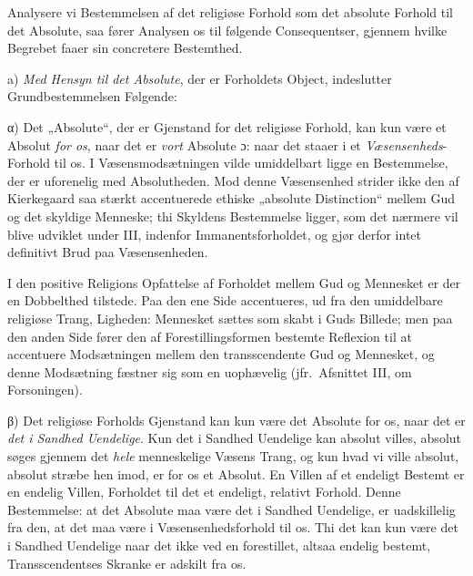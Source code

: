 Analysere vi Bestemmelsen af det religiøse Forhold som det absolute Forhold
til det Absolute, saa fører Analysen os til følgende Consequentser, gjennem
hvilke Begrebet faaer sin concretere Bestemthed.

a) \emph{Med Hensyn til det Absolute}, der er Forholdets Object, indeslutter
Grundbestemmelsen Følgende:

α) Det „Absolute“, der er Gjenstand for det religiøse Forhold, kan kun være
et Absolut \emph{for os}, naar det er \emph{vort} Absolute ɔ: naar det staaer
i et \emph{Væsensenheds}-Forhold til os. I Væsensmodsætningen vilde
umiddelbart ligge en Bestemmelse, der er uforenelig med Absolutheden. Mod
denne Væsensenhed strider ikke den af Kierkegaard saa stærkt accentuerede
ethiske „absolute Distinction“ mellem Gud og det skyldige Menneske; thi
Skyldens Bestemmelse ligger, som det nærmere vil blive udviklet under III,
indenfor Immanentsforholdet, og gjør derfor intet definitivt Brud paa
Væsensenheden.

I den positive Religions Opfattelse af Forholdet mellem Gud og Mennesket er
der en Dobbelthed tilstede. Paa den ene Side accentueres, ud fra den
umiddelbare religiøse Trang, Ligheden: Mennesket sættes som skabt i Guds
Billede; men paa den anden Side fører den af Forestillingsformen bestemte
Reflexion til at accentuere Modsætningen mellem den transscendente Gud og
Mennesket, og denne Modsætning fæstner sig som en uophævelig (jfr.\ Afsnittet
III, om Forsoningen).

β) Det religiøse Forholds Gjenstand kan kun være det Absolute for os, naar
det er \emph{det i Sandhed Uendelige}. Kun det i Sandhed Uendelige kan absolut
villes, absolut søges gjennem det \emph{hele} menneskelige Væsens Trang, og
kun hvad vi ville absolut, absolut stræbe hen imod, er for
 os et Absolut. En Villen af et endeligt Bestemt er en endelig Villen,
Forholdet til det et endeligt, relativt Forhold. Denne Bestemmelse: at det
Absolute maa være det i Sandhed Uendelige, er uadskillelig fra den, at det maa
være i Væsensenhedsforhold til os. Thi det kan kun være det i Sandhed
Uendelige naar det ikke ved en forestillet, altsaa endelig bestemt,
Transscendentses Skranke er adskilt fra os.

